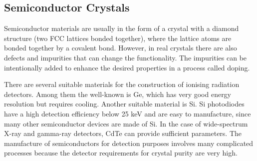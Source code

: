 \subsection{Semiconductor Crystals}
Semiconductor materials are usually in the form of a crystal with a diamond structure (two FCC lattices bonded together), where the lattice atoms are bonded together by a covalent bond. However, in real crystals there are also defects and impurities that can change the functionality. The impurities can be intentionally added to enhance the desired properties in a process called doping. 
\par
There are several suitable materials for the construction of ionising radiation detectors. Among them the well-known is Ge, which has very good energy resolution but requires cooling. Another suitable material is Si. Si photodiodes have a high detection efficiency below 25 keV and are easy to manufacture, since many other semiconductor devices are made of Si. In the case of wide-spectrum X-ray and gamma-ray detectors, CdTe can provide sufficient parameters. The manufacture of semiconductors for detection purposes involves many complicated processes because the detector requirements for crystal purity are very high.




 
